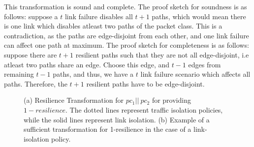 
This transformation is sound and complete. The proof sketch for soundness
 is as follows: suppose a $t$ link failure
disables all $t+1$ paths, which would mean there is one link which disables atleast two paths
of the packet class. This is a contradiction, as the paths are edge-disjoint from each other, and one
link failure can affect one path at maximum. The proof sketch for completeness is as follows:
suppose there are $t+1$ resilient paths such that they are not all edge-disjoint, i.e atleast two
paths share an edge. Choose this edge, and $t-1$ edges from remaining $t-1$ paths, and
thus, we have a $t$ link failure scenario which affects all paths. Therefore, the $t+1$ resilient
paths have to be edge-disjoint.
\begin{figure}
	\centering
	\caption{\label{fig:restransform}
		(a) Resilience Transformation for $pc_1 || \ pc_2$ for providing $1-resilience$. 
		The dotted lines represent traffic isolation policies, 
		while the solid lines represent link isolation. (b) Example of a sufficient transformation
		for 1-resilience in the case of a link-isolation policy.}
\end{figure}



